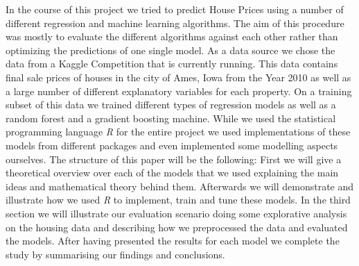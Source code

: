 In the course of this project we tried to predict House Prices using a number of different regression and machine learning algorithms. The aim of this procedure was mostly to evaluate the different algorithms against each other rather than optimizing the predictions of one single model. As a data source we chose the data from a Kaggle Competition that is currently running. This data contains final sale prices of houses in the city of Ames, Iowa from the Year 2010 as well as a large number of different explanatory variables for each property. On a training subset of this data we trained different types of regression models as well as a random forest and a gradient boosting machine. While we used the statistical programming language \textit{R} for the entire project we used implementations of these models from different packages and even implemented some modelling aspects ourselves. The structure of this paper will be the following: First we will give a theoretical overview over each of the models that we used explaining the main ideas and mathematical theory behind them. Afterwards we will demonstrate and illustrate how we used \textit{R} to implement, train and tune these models. In the third section we will illustrate our evaluation scenario doing some explorative analysis on the housing data and describing how we preprocessed the data and evaluated the models. After having presented the results for each model we complete the study by summarising our findings and conclusions. 